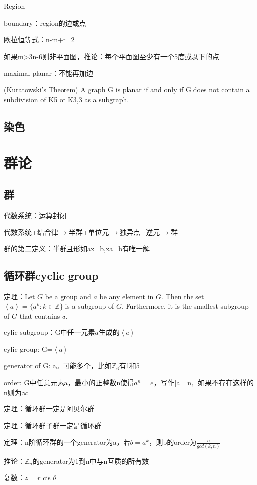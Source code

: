 \documentclass[cn,hazy,blue,screen,14pt]{note}
\begin{document}
Region

boundary：region的边或点

欧拉恒等式：n-m+r=2

如果m>3n-6则非平面图，推论：每个平面图至少有一个5度或以下的点

maximal planar：不能再加边

(Kuratowski’s Theorem) A graph G is planar if and only if G does not contain a subdivision of K5 or K3,3 as a subgraph.

\subsection{染色}


\section{群论}

\subsection{群}
代数系统：运算封闭

代数系统+结合律$\rightarrow$半群+单位元$\rightarrow$独异点+逆元$\rightarrow$群

群的第二定义：半群且形如ax=b,xa=b有唯一解

\subsection{循环群cyclic group}
定理：Let $G$ be a group and $a$ be any element in $G$. Then the set $\left<a\right> = \{a^{k}:k \in\mathbb{Z}\}$
is a subgroup of $G$. Furthermore, it is the smallest subgroup of $G$ that contains $a$.


cylic subgroup：G中任一元素$a$生成的$\left<a\right>$

cylic group: G=$\left<a\right>$ 

generator of G: a。可能多个，比如$\mathbb{Z}_{6}$有1和5

order: G中任意元素a，最小的正整数n使得$a^{n}=e$，写作|a|=n，如果不存在这样的n则为$\infty$

定理：循环群一定是阿贝尔群

定理：循环群子群一定是循环群

定理：n阶循环群的一个generator为a，若$b=a^{k}$，则b的order为$\frac{n}{gcd(k,n)}$

推论：$\mathbb{Z}_{n}$的generator为1到n中与n互质的所有数

复数：$z=r$ cis $\theta$
\end{document}

